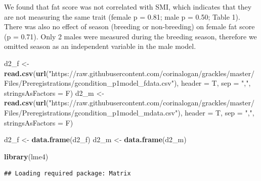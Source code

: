 \documentclass[
]{article}
\newenvironment{Shaded}{\begin{snugshade}}{\end{snugshade}}
\newcommand{\DataTypeTok}[1]{\textcolor[rgb]{0.13,0.29,0.53}{#1}}
\newcommand{\KeywordTok}[1]{\textcolor[rgb]{0.13,0.29,0.53}{\textbf{#1}}}
\newcommand{\NormalTok}[1]{#1}
\newcommand{\StringTok}[1]{\textcolor[rgb]{0.31,0.60,0.02}{#1}}
\begin{document}
We found that fat score was not correlated with SMI, which indicates
that they are not measuring the same trait (female p = 0.81; male p =
0.50; Table 1). There was also no effect of season (breeding or
non-breeding) on female fat score (p = 0.71). Only 2 males were measured
during the breeding season, therefore we omitted season as an
independent variable in the male model.

\begin{Shaded}
\begin{Highlighting}[]
\NormalTok{d2_f <-}\StringTok{ }\KeywordTok{read.csv}\NormalTok{(}\KeywordTok{url}\NormalTok{(}\StringTok{"https://raw.githubusercontent.com/corinalogan/grackles/master/Files/Preregistrations/gcondition_p1model_fdata.csv"}\NormalTok{), }
    \DataTypeTok{header =}\NormalTok{ T, }\DataTypeTok{sep =} \StringTok{","}\NormalTok{, }\DataTypeTok{stringsAsFactors =}\NormalTok{ F)}
\NormalTok{d2_m <-}\StringTok{ }\KeywordTok{read.csv}\NormalTok{(}\KeywordTok{url}\NormalTok{(}\StringTok{"https://raw.githubusercontent.com/corinalogan/grackles/master/Files/Preregistrations/gcondition_p1model_mdata.csv"}\NormalTok{), }
    \DataTypeTok{header =}\NormalTok{ T, }\DataTypeTok{sep =} \StringTok{","}\NormalTok{, }\DataTypeTok{stringsAsFactors =}\NormalTok{ F)}

\NormalTok{d2_f <-}\StringTok{ }\KeywordTok{data.frame}\NormalTok{(d2_f)}
\NormalTok{d2_m <-}\StringTok{ }\KeywordTok{data.frame}\NormalTok{(d2_m)}

\KeywordTok{library}\NormalTok{(lme4)}
\end{Highlighting}
\end{Shaded}

\begin{verbatim}
## Loading required package: Matrix
\end{verbatim}
\end{document}
